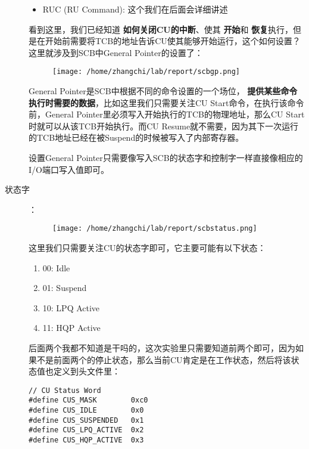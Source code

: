 \documentclass{article}
\newcommand{\highlight}[1]{{\bfseries \color{red}  #1}}
\begin{document}
\begin{CJK*}{UTF8}{gkai}
\begin{description}
\begin{itemize}
{}
\item{RUC (RU Command): 这个我们在后面会详细讲述}
\end{itemize}

看到这里，我们已经知道\highlight{如何关闭CU的中断}、使其\highlight{开始}和\highlight{恢复}执行，但是在开始前需要将TCB的地址告诉CU使其能够开始运行，这个如何设置？这里就涉及到SCB中General Pointer的设置了：

\newpage

\begin{figure}[htp]
\centering
\texttt{[image: /home/zhangchi/lab/report/scbgp.png]}
\end{figure}

General Pointer是SCB中根据不同的命令设置的一个场位，\highlight{提供某些命令执行时需要的数据}，比如这里我们只需要关注CU Start命令，在执行该命令前，General Pointer里必须写入开始执行的TCB的物理地址，那么CU Start时就可以从该TCB开始执行。而CU Resume就不需要，因为其下一次运行的TCB地址已经在被Suspend的时候被写入了内部寄存器。

设置General Pointer只需要像写入SCB的状态字和控制字一样直接像相应的I/O端口写入值即可。

\item[状态字]：\\
\begin{figure}[htp]
\centering
\texttt{[image: /home/zhangchi/lab/report/scbstatus.png]}
\end{figure}

这里我们只需要关注CU的状态字即可，它主要可能有以下状态：

\begin{enumerate}
\item{00: Idle}
\item{01: Suspend}
\item{10: LPQ Active}
\item{11: HQP Active}
\end{enumerate}

后面两个我都不知道是干吗的，这次实验里只需要知道前两个即可，因为如果不是前面两个的停止状态，那么当前CU肯定是在工作状态，然后将该状态值也定义到头文件里：


\begin{lstlisting}[style=ccode, title={\scriptsize \ttfamily \bfseries kern/e100.h}]
// CU Status Word
#define CUS_MASK        0xc0
#define CUS_IDLE        0x0
#define CUS_SUSPENDED   0x1
#define CUS_LPQ_ACTIVE  0x2
#define CUS_HQP_ACTIVE  0x3
\end{lstlisting}


\end{description}
\end{CJK*}
\end{document}
